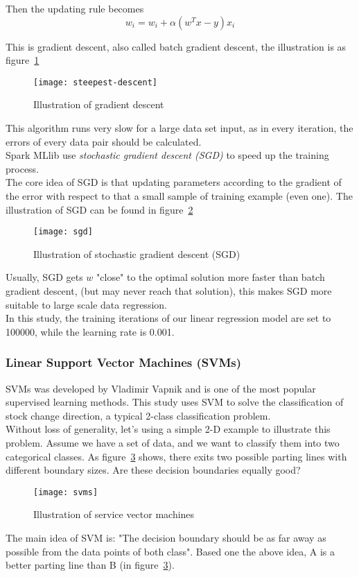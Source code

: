 Then the updating rule becomes
\begin{equation}
w_i = w_i + \alpha (w^Tx-y)x_i
\end{equation}

This is gradient descent, also called batch gradient descent, the illustration is as figure~\ref{fg:gradient_descent}
\begin{figure}[h]
	\centering
	\texttt{[image: steepest-descent]}
	\caption{Illustration of gradient descent}
	\label{fg:gradient_descent}
\end{figure}

This algorithm runs very slow for a large data set input, as in every iteration, the errors of every data pair should be calculated.\\


Spark MLlib use \emph{stochastic gradient descent (SGD)} to speed up the training process\cite{7_mllib_linear_methods}.\\


The core idea of SGD is that updating parameters according to the gradient of the error with respect to that a small sample of training example (even one). The illustration of SGD can be found in figure~\ref{fg:SGD}
\begin{figure}[h]
	\centering
	\texttt{[image: sgd]}
	\caption{Illustration of stochastic gradient descent (SGD)}
	\label{fg:SGD}
\end{figure}
Usually, SGD gets $ w $ "close" to the optimal solution more faster than batch gradient descent\cite{bottou2010large}, (but may never reach that solution), this makes SGD more suitable to large scale data regression.\\


In this study, the training iterations of our linear regression model are set to 100000, while the learning rate is 0.001.

\subsubsection{Linear Support Vector Machines (SVMs)}
SVMs was developed by Vladimir Vapnik\cite{cortes1995support} and is one of the most popular supervised learning methods. This study uses SVM to solve the classification of stock change direction, a typical 2-class classification problem.\\


Without loss of generality, let's using a simple 2-D example to illustrate this problem. Assume we have a set of data, and we want to classify them into two categorical classes. As figure~\ref{fg:SVM} shows, there exits two possible parting lines with different boundary sizes. Are these decision boundaries equally good?
\begin{figure}[h]
	\centering
	\texttt{[image: svms]}
	\caption{Illustration of service vector machines\cite{8_svm_2016}}
	\label{fg:SVM}
\end{figure}
The main idea of SVM is: "The decision boundary should be as far away as possible from the data points of both class"\cite{4_kantardzic}. Based one the above idea, A is a better parting line than B (in figure~\ref{fg:SVM}).\\


